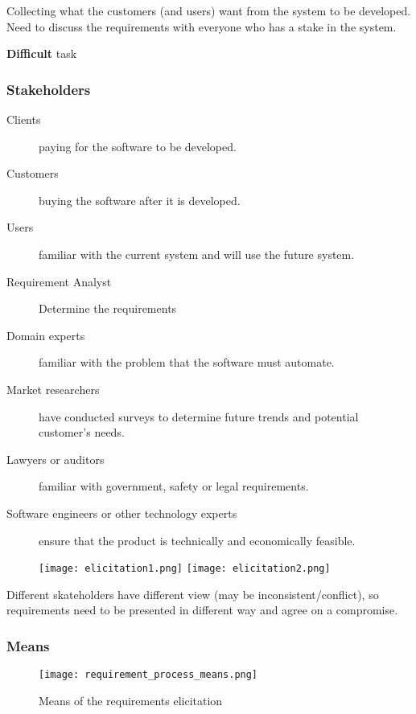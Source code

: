 Collecting what the customers (and users) want from the system to be developed.
Need to discuss the requirements with everyone who has a stake in the system.

\textbf{Difficult} task 

\subsubsection{Stakeholders}

\begin{description}
    \item[Clients] paying for the software to be developed.
    \item[Customers] buying the software after it is developed.
    \item[Users] familiar with the current system and will use the future system.
    \item[Requirement Analyst] Determine the requirements
    \item[Domain experts] familiar with the problem that the software must automate.
    \item[Market researchers] have conducted surveys to determine future trends and potential customer’s needs.
    \item[Lawyers or auditors] familiar with government, safety or legal requirements.
    \item[Software engineers or other technology experts] ensure that the product is technically and economically feasible.
\end{description}

\begin{figure}[!ht]
    \centering
    \texttt{[image: elicitation1.png]}
    \texttt{[image: elicitation2.png]}
\end{figure}


Different skateholders have different view (may be inconsistent/conflict), so requirements need to be
presented in different way and agree on a compromise.

\subsubsection{Means}

\begin{figure}[!ht]
    \centering
    \texttt{[image: requirement\_process\_means.png]}
    \caption{Means of the requirements elicitation}
\end{figure}

